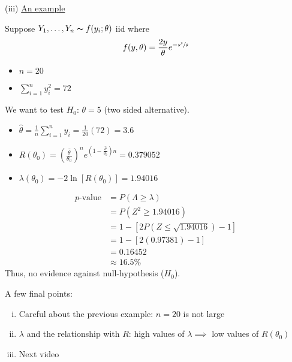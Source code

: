 (iii) \underline{An example}
\begin{exbox}
    \begin{example}
        Suppose $ Y_1,\ldots ,Y_n \thicksim f(y_i;\theta) $ iid where
        \[ f(y,\theta)=\frac{2y}{\theta}e^{-\sfrac{y^2}{\theta}} \]
        \begin{itemize}
            \item $ n=20 $
            \item $ \sum\limits_{i=1}^{n} y_i^2=72 $
        \end{itemize}

        We want to test $ H_0 $: $ \theta=5 $ (two sided alternative).
        \begin{itemize}
            \item $ \hat{\theta}=\frac{1}{n} \sum\limits_{i=1}^{n}y_i=\frac{1}{20}(72)=3.6 $
            \item $ R(\theta_0)=\left( \frac{\hat{\theta}}{\theta_0} \right)^n
                      e^{\left(1-\frac{\hat{\theta}}{\theta_0}\right)n} = 0.379052 $
            \item $ \lambda(\theta_0) =-2\ln \left[ R(\theta_0) \right]=1.94016 $
        \end{itemize}
        \begin{align*}
            p\text{-value}
             & =P(\Lambda\geqslant \lambda)                       \\
             & =P(Z^2\geqslant 1.94016)                           \\
             & =1-\left[ 2 P(Z\leqslant \sqrt{1.94016})-1 \right] \\
             & = 1-\left[ 2(0.97381)-1 \right]                    \\
             & = 0.16452                                          \\
             & \approx 16.5\%
        \end{align*}
        Thus, no evidence against null-hypothesis ($ H_0 $).
    \end{example}
\end{exbox}
A few final points:
\begin{enumerate}[(i)]
    \item Careful about the previous example:
          \subitem $ n=20 $ is not large
    \item $ \lambda $ and the relationship with $ R $:
          \subitem high values of $ \lambda\implies $ low values of $ R(\theta_0) $
    \item Next video
\end{enumerate}

